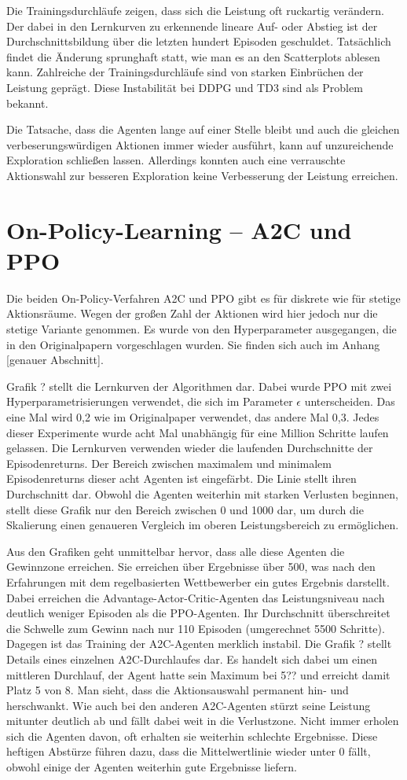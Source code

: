 Die Trainingsdurchläufe zeigen, dass sich die Leistung oft ruckartig verändern.
Der dabei in den Lernkurven zu erkennende lineare Auf- oder Abstieg ist der Durchschnittsbildung über die letzten hundert Episoden geschuldet.
Tatsächlich findet die Änderung sprunghaft statt, wie man es an den Scatterplots ablesen kann.
Zahlreiche der Trainingsdurchläufe sind von starken Einbrüchen der Leistung geprägt.
Diese Instabilität bei DDPG und TD3 sind als Problem bekannt.

Die Tatsache, dass die Agenten lange auf einer Stelle bleibt und auch die gleichen verbeserungswürdigen Aktionen immer wieder ausführt, kann auf unzureichende Exploration schließen lassen.
Allerdings konnten auch eine verrauschte Aktionswahl zur besseren Exploration keine Verbesserung der Leistung erreichen.

\section{On-Policy-Learning -- A2C und PPO}
Die beiden On-Policy-Verfahren A2C und PPO gibt es für diskrete wie für stetige Aktionsräume.
Wegen der großen Zahl der Aktionen wird hier jedoch nur die stetige Variante genommen.
Es wurde von den Hyperparameter ausgegangen, die in den Originalpapern vorgeschlagen wurden.
Sie finden sich auch im Anhang [genauer Abschnitt].

Grafik ? stellt die Lernkurven der Algorithmen dar.
Dabei wurde PPO mit zwei Hyperparametrisierungen verwendet, die sich im Parameter $\epsilon$ unterscheiden.
Das eine Mal wird 0,2 wie im Originalpaper verwendet, das andere Mal 0,3.
Jedes dieser Experimente wurde acht Mal unabhängig für eine Million Schritte laufen gelassen.
Die Lernkurven verwenden wieder die laufenden Durchschnitte der Episodenreturns.
Der Bereich zwischen maximalem und minimalem Episodenreturns dieser acht Agenten ist eingefärbt.
Die Linie stellt ihren Durchschnitt dar.
Obwohl die Agenten weiterhin mit starken Verlusten beginnen, stellt diese Grafik nur den Bereich zwischen 0 und 1000 dar, um durch die Skalierung einen genaueren Vergleich im oberen Leistungsbereich zu ermöglichen.

Aus den Grafiken geht unmittelbar hervor, dass alle diese Agenten die Gewinnzone erreichen.
Sie erreichen über Ergebnisse über 500, was nach den Erfahrungen mit dem regelbasierten Wettbewerber ein gutes Ergebnis darstellt.
Dabei erreichen die Advantage-Actor-Critic-Agenten das Leistungsniveau nach deutlich weniger Episoden als die PPO-Agenten.
Ihr Durchschnitt überschreitet die Schwelle zum Gewinn nach nur 110 Episoden (umgerechnet 5500 Schritte).
Dagegen ist das Training der A2C-Agenten merklich instabil.
Die Grafik ? stellt Details eines einzelnen A2C-Durchlaufes dar.
Es handelt sich dabei um einen mittleren Durchlauf, der Agent hatte sein Maximum bei 5?? und erreicht damit Platz 5 von 8.
Man sieht, dass die Aktionsauswahl permanent hin- und herschwankt.
Wie auch bei den anderen A2C-Agenten stürzt seine Leistung mitunter deutlich ab und fällt dabei weit in die Verlustzone.
Nicht immer erholen sich die Agenten davon, oft erhalten sie weiterhin schlechte Ergebnisse.
Diese heftigen Abstürze führen dazu, dass die Mittelwertlinie wieder unter 0 fällt, obwohl einige der Agenten weiterhin gute Ergebnisse liefern.

